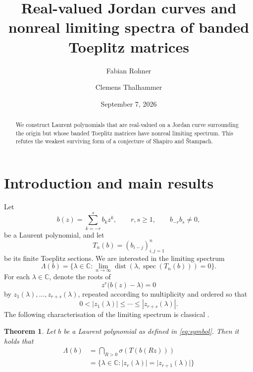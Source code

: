 \documentclass[11pt,a4paper]{amsart}
\title[Jordan curves and Toeplitz limiting spectra]{Real-valued Jordan curves and nonreal limiting spectra of banded Toeplitz matrices}
\author[F. Rohner]{Fabian Rohner}
\author[C. Thalhammer]{Clemens Thalhammer}
\date{September 7, 2026}
\newtheorem{theorem}{Theorem}[section]
\theoremstyle{remark}
\numberwithin{equation}{section}
\newcommand{\C}{\mathbb C}
\DeclareMathOperator{\spec}{spec}
\begin{document}
\begin{abstract}
We construct Laurent polynomials that are real-valued on a Jordan curve
  surrounding the origin but whose banded Toeplitz matrices have nonreal
  limiting spectrum. This refutes the weakest surviving form of a conjecture
  of Shapiro and \v{S}tampach.
\end{abstract}

\maketitle

\section{Introduction and main results}
\label{sec:intro}

Let
\begin{equation}
 b(z)=\sum_{k=-r}^{s}b_kz^k,
 \qquad r,s\geq1,\qquad b_{-r}b_s\neq0,
 \label{eq:symbol}
\end{equation}
be a Laurent polynomial, and let
\[
 T_n(b)=(b_{i-j})_{i,j=1}^{n}
\]
be its finite Toeplitz sections. We are interested in the limiting spectrum
\begin{equation}
 \Lambda(b)=\{\lambda \in \C: \lim_{n\rightarrow\infty}\operatorname{dist}(\lambda, \spec(T_n(b)))=0\}.
 \label{eq:limiting-spectrum}
\end{equation}
For each \(\lambda\in\C\), denote the roots of
\begin{equation}
 z^r\bigl(b(z)-\lambda\bigr)=0
 \label{eq:root-polynomial}
\end{equation}
by \(z_1(\lambda),\ldots,z_{r+s}(\lambda)\), repeated according to multiplicity and ordered so that
\[
 0<|z_1(\lambda)|\leq\cdots\leq|z_{r+s}(\lambda)|.
\]
The following characterisation of the limiting spectrum is classical \cite{schmidt1960toeplitz}.
\begin{theorem}\label{thm: SchmidtSpitzer}
    Let $b$ be a Laurent polynomial as defined in \ref{eq:symbol}. Then it holds that
    \begin{equation}
        \begin{aligned}
            \Lambda(b) &=\bigcap_{R>0}\sigma(T(b(Rz)))\\
            &=\{\lambda \in \C: \lvert z_r(\lambda)\rvert=\lvert z_{r+1}(\lambda)\rvert\}
        \end{aligned}
    \end{equation}
\end{theorem}
\end{document}
